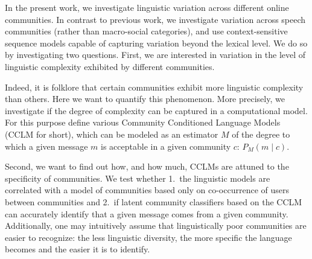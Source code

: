 \documentclass[11pt]{article}
\newcommand\jp[1]{\todo[backgroundcolor=blue!10]{JP: #1}}
\begin{document}
In the present work, we investigate linguistic variation
across different online communities. In contrast to previous work, we
investigate variation across speech communities (rather than
macro-social categories), and use context-sensitive sequence models
capable of capturing variation beyond the lexical level.
%
We do so by investigating two questions.  First, we are interested in
variation in the level of linguistic complexity exhibited by different
communities.
  

%
Indeed, it is folklore that certain communities exhibit more
linguistic complexity than others.  Here we want to quantify this
phenomenon.  More precisely, we investigate if the degree of
complexity can be captured in a computational model.  For this purpose
define various Community Conditioned Language Models (CCLM for short),
which can be modeled as an estimator $M$ of the degree to which a
given message $m$ is acceptable in a given community $c$:
\(P_M(m \mid c)\).

Second, we want to find out how, and how much, CCLMs are attuned to
the specificity of communities. We test whether 1.\ the linguistic
models are correlated with a model of communities based only on
co-occurrence of users between communities and 2.\ if latent community
classifiers based on the CCLM can accurately identify that a given
message comes from a given community. Additionally, one may
intuitively assume that linguistically poor communities are easier to
recognize: the less linguistic diversity, the more specific the
language becomes and the easier it is to identify.
\end{document}
